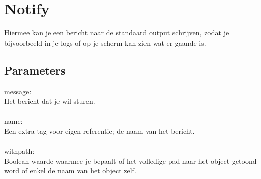 \section{Notify}

Hiermee kan je een bericht naar de standaard output schrijven, zodat je bijvoorbeeld in je logs of op je scherm kan zien wat er gaande is.

\subsection{Parameters}
message:\\
Het bericht dat je wil sturen.\\\\
%
name:\\
Een extra tag voor eigen referentie; de naam van het bericht.\\\\
%
withpath:\\
Boolean waarde waarmee je bepaalt of het volledige pad naar het object getoond word of enkel de naam van het object zelf.\\\\
